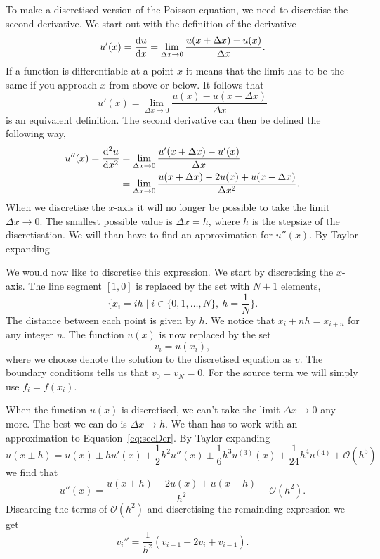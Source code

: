 \documentclass[english,notitlepage,aps,pra,10pt]{revtex4-2}
\begin{document}
To make a discretised version of the Poisson equation, we need to discretise the second derivative. We start out with the definition of the derivative
\begin{equation}
    u'(x) = \dv{u}{x} = \lim_{\Delta x \to 0} \frac{u(x+\Delta x) - u(x)}{\Delta x}.
\end{equation}
If a function is differentiable at a point $x$ it means that the limit has to be the same if you approach $x$ from above or below. It follows that 
\begin{equation}
    u'(x) = \lim_{\Delta x \to 0} \frac{u(x) - u(x-\Delta x)}{\Delta x}
\end{equation}
is an equivalent definition. The second derivative can then be defined the following way,
\begin{equation}
    \begin{split}
        u''(x) = \dv[2]{u}{x} &= \lim_{\Delta x \to 0} \frac{u'(x+\Delta x) - u'(x)}{\Delta x} \\
            &= \lim_{\Delta x \to 0} \frac{u(x+\Delta x) - 2u(x) + u(x-\Delta x)}{\Delta x^2}.
    \end{split}
    \label{eq:secDer}
\end{equation}
When we discretise the $x$-axis it will no longer be possible to take the limit $\Delta x \to 0$. The smallest possible value is $\Delta x = h$, where $h$ is the stepsize of the discretisation. We will than have to find an approximation for $u''(x)$. By Taylor expanding 

We would now like to discretise this expression. We start by discretising the $x$-axis. The line segment $[1,0]$ is replaced by the set with $N+1$ elements, 
\begin{equation}
    \{x_i = i h \mid i\in\{0,1, \dots, N\},\ h = \frac{1}{N}\}.
\end{equation}
The distance between each point is given by $h$. We notice that $x_i + nh = x_{i+n}$ for any integer $n$. The function $u(x)$ is now replaced by the set
\begin{equation}
    v_i = u(x_i),
\end{equation}
where we choose denote the solution to the discretised equation as $v$. The boundary conditions tells us that $v_0 = v_N = 0$. For the source term we will simply use $f_i = f(x_i)$. 

When the function $u(x)$ is discretised, we can't take the limit $\Delta x \to 0$ any more. The best we can do is $\Delta x \to h$. We than has to work with an approximation to Equation~\ref{eq:secDer}. By Taylor expanding 
\begin{equation}
    u(x \pm h) = u(x) \pm h u'(x) + \frac{1}{2} h^2 u''(x) \pm \frac{1}{6} h^3 u^{(3)}(x) + \frac{1}{24} h^4 u^{(4)} + \mathcal{O}(h^5)
\end{equation}
we find that 
\begin{equation}
    u''(x) = \frac{u(x+h) - 2u(x) + u(x-h)}{h^2} + \mathcal{O}(h^2).
\end{equation}
Discarding the terms of $\mathcal{O}(h^2)$ and discretising the remainding expression we get
\begin{equation}
    v_i'' = \frac{1}{h^2}(v_{i+1} - 2v_i + v_{i-1}).
\end{equation}
\end{document}
